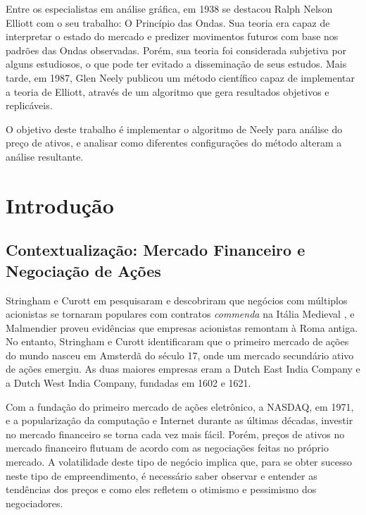 \documentclass[12pt]{article}
\begin{document}
Entre os especialistas em análise gráfica, em 1938 se destacou Ralph Nelson Elliott com
o seu trabalho: O Princípio das Ondas.
Sua teoria era capaz de interpretar o estado do mercado e predizer movimentos futuros com
base nos padrões das Ondas observadas. Porém, sua teoria foi considerada subjetiva por alguns
estudiosos, o que pode ter evitado a disseminação de seus estudos. Mais tarde, em 1987,
Glen Neely publicou um método científico capaz de implementar a teoria de Elliott, através
de um algoritmo que gera resultados objetivos e replicáveis.

O objetivo deste trabalho é implementar o algoritmo de Neely para análise do preço de ativos,
e analisar como diferentes configurações do método alteram a análise resultante.

\newpage


{}
\listoffigures

\newpage
{}
{}
\listoftables

\newpage

{}
\tableofcontents

\newpage

\pagestyle{plain}

\section{Introdução}
\subsection{Contextualização: Mercado Financeiro e Negociação de Ações} \label{sec:Stockmarket}

Stringham e Curott em \cite{StringhamCurott:2015} pesquisaram e descobriram que 
negócios com múltiplos acionistas se tornaram populares com contratos \textit{commenda}
na Itália Medieval \cite{Greif:2006}, e Malmendier \cite{Malmendier:2009} proveu evidências
que empresas acionistas remontam à Roma antiga. No entanto, Stringham e Curott identificaram
que o primeiro mercado de ações do mundo nasceu em Amsterdã do século 17, onde um mercado
secundário ativo de ações emergiu. As duas maiores empresas eram a Dutch East India Company
e a Dutch West India Company, fundadas em 1602 e 1621. 

Com a fundação do primeiro mercado de ações eletrônico, a NASDAQ, em 1971, e a popularização
da computação e Internet durante as últimas décadas, investir no mercado financeiro se
torna cada vez mais fácil. Porém, preços de ativos no mercado financeiro flutuam de acordo
com as negociações feitas no próprio mercado. A volatilidade deste tipo de negócio implica
que, para se obter sucesso neste tipo de empreendimento, é necessário saber observar e entender
as tendências dos preços e como eles refletem o otimismo e pessimismo dos negociadores.
\end{document}
